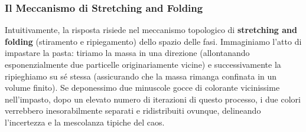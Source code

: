 \documentclass[openany]{book}
\theoremstyle{definition}
\theoremstyle{remark}
\begin{document}
\subsubsection*{Il Meccanismo di Stretching and Folding}
Intuitivamente, la risposta risiede nel meccanismo topologico di \textbf{stretching and folding} (stiramento e ripiegamento) dello spazio delle fasi. Immaginiamo l'atto di impastare la pasta: tiriamo la massa in una direzione (allontanando esponenzialmente due particelle originariamente vicine) e successivamente la ripieghiamo su sé stessa (assicurando che la massa rimanga confinata in un volume finito). Se deponessimo due minuscole gocce di colorante vicinissime nell'impasto, dopo un elevato numero di iterazioni di questo processo, i due colori verrebbero inesorabilmente separati e ridistribuiti ovunque, delineando l'incertezza e la mescolanza tipiche del caos.
\end{document}
